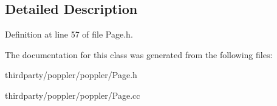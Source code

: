 \subsection{Detailed Description}


Definition at line 57 of file Page.\+h.



The documentation for this class was generated from the following files\+:\begin{DoxyCompactItemize}
\item 
thirdparty/poppler/poppler/Page.\+h\item 
thirdparty/poppler/poppler/Page.\+cc\end{DoxyCompactItemize}
